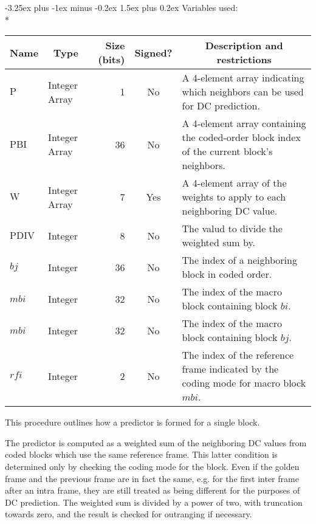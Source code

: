 \documentclass[9pt,letterpaper]{book}
\makeatletter
\newcommand{\idx}[1]{{\ensuremath{\mathit{#1}}}}
\newcommand{\bi}{\idx{bi}}
\newcommand{\bj}{\idx{bj}}
\newcommand{\mbi}{\idx{mbi}}
\newcommand{\rfi}{\idx{rfi}}
\newcommand{\bitvar}[1]{\ensuremath{\mathbf{\bm{#1}}}}
\newcommand{\locvar}[1]{\ensuremath{\mathrm{#1}}}
\numberwithin{equation}{chapter}
\numberwithin{figure}{chapter}
\numberwithin{table}{chapter}
\renewcommand{\paragraph}{\@startsection{paragraph}{4}{0ex}%
 {-3.25ex plus -1ex minus -0.2ex}%
 {1.5ex plus 0.2ex}%
 {\normalfont\normalsize\bfseries}}
\makeatother
\begin{document}
\paragraph{Variables used:}\hfill\\*
\begin{tabularx}{\textwidth}{@{}llrcX@{}}\toprule
\multicolumn{1}{c}{Name} &
\multicolumn{1}{c}{Type} &
\multicolumn{1}{p{30pt}}{\centering Size (bits)} &
\multicolumn{1}{c}{Signed?} &
\multicolumn{1}{c}{Description and restrictions} \\\midrule\endhead
\locvar{P}        & \multicolumn{1}{p{40pt}}{Integer Array} &
                               1 & No  & A 4-element array indicating which
 neighbors can be used for DC prediction. \\
\locvar{PBI}      & \multicolumn{1}{p{40pt}}{Integer Array} &
                              36 & No  & A 4-element array containing the
 coded-order block index of the current block's neighbors. \\
\locvar{W}        & \multicolumn{1}{p{40pt}}{Integer Array} &
                               7 & Yes & A 4-element array of the weights to
 apply to each neighboring DC value. \\
\locvar{PDIV}     & Integer &  8 & No  & The valud to divide the weighted sum
 by. \\
\locvar{\bj}      & Integer & 36 & No  & The index of a neighboring block in
 coded order. \\
\locvar{\mbi}     & Integer & 32 & No  & The index of the macro block
 containing block \bitvar{\bi}. \\
\locvar{\mbi}     & Integer & 32 & No  & The index of the macro block
 containing block \locvar{\bj}. \\
\locvar{\rfi}     & Integer &  2 & No  & The index of the reference frame
 indicated by the coding mode for macro block \locvar{\mbi}. \\
\bottomrule\end{tabularx}
\medskip

This procedure outlines how a predictor is formed for a single block.

The predictor is computed as a weighted sum of the neighboring DC values from
 coded blocks which use the same reference frame.
This latter condition is determined only by checking the coding mode for the
 block.
Even if the golden frame and the previous frame are in fact the same, e.g. for
 the first inter frame after an intra frame, they are still treated as being
 different for the purposes of DC prediction.
The weighted sum is divided by a power of two, with truncation towards zero,
 and the result is checked for outranging if necessary.
\end{document}
